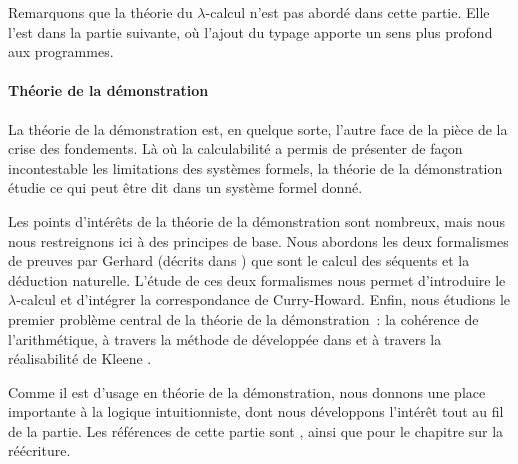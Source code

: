 Remarquons que la théorie du $\lambda$-calcul n'est pas abordé dans cette
partie. Elle l'est dans la partie suivante, où l'ajout du typage apporte un
sens plus profond aux programmes.

\paragraph{Théorie de la démonstration}
La théorie de la démonstration est, en quelque sorte, l'autre face de la pièce
de la crise des fondements. Là où la calculabilité a permis de présenter de
façon incontestable les limitations des systèmes formels, la théorie de la
démonstration étudie ce qui peut être dit dans un système formel donné.

Les points d'intérêts de la théorie de la démonstration sont nombreux, mais
nous nous restreignons ici à des principes de base. Nous abordons les deux
formalismes de preuves par Gerhard  (décrits dans
\cite{Gentzen1934I,Gentzen1935II}) que sont le calcul des séquents et la
déduction naturelle.
L'étude de ces deux formalismes nous permet d'introduire le $\lambda$-calcul et
d'intégrer la correspondance de Curry-Howard. Enfin, nous étudions le premier
problème central de la théorie de la démonstration~: la cohérence de
l'arithmétique, à travers la méthode de  développée dans
\cite{Gentzen1936} et à travers la réalisabilité de Kleene \cite{Kleene1945}.

Comme il est d'usage en théorie de la démonstration, nous donnons une place
importante à la logique intuitionniste, dont nous développons l'intérêt tout
au fil de la partie.
Les références de cette partie sont
\cite{Girard2006,SorensenUrzyczyn2006}, ainsi que
\cite{BaaderNipkow1998} pour le chapitre sur la réécriture.

